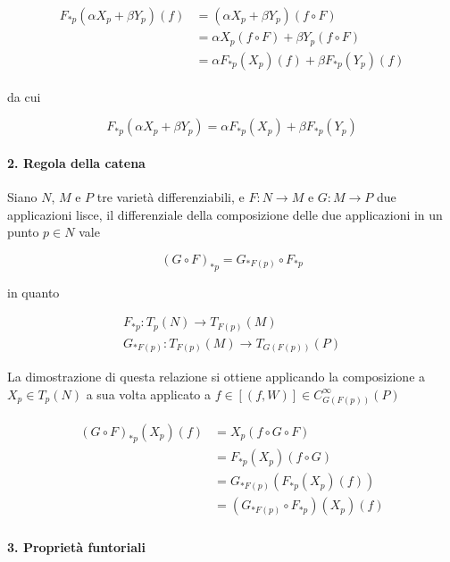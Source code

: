 \begin{align}
	\begin{split}
		F_{*p}(\alpha X_{p} + \beta Y_{p})(f) &= (\alpha X_{p} + \beta Y_{p})(f \circ F)\\
		&= \alpha X_{p}(f \circ F) + \beta Y_{p}(f \circ F)\\
		&= \alpha F_{*p}(X_{p})(f) + \beta F_{*p}(Y_{p})(f)
	\end{split}
\end{align}

da cui

\begin{equation}
	F_{*p}(\alpha X_{p} + \beta Y_{p}) = \alpha F_{*p}(X_{p}) + \beta F_{*p}(Y_{p})
\end{equation}

\paragraph{2. Regola della catena}

Siano $ N $, $ M $ e $ P $ tre varietà differenziabili, e $ F : N \to M $ e $ G : M \to P $ due applicazioni lisce, il differenziale della composizione delle due applicazioni in un punto $ p \in N $ vale

\begin{equation}
	(G \circ F)_{*p} = G_{*F(p)} \circ F_{*p}
\end{equation}

in quanto

\begin{gather}
	F_{*p} : T_{p}(N) \to T_{F(p)}(M)\\
	G_{*F(p)} : T_{F(p)}(M) \to T_{G(F(p))}(P)
\end{gather}

La dimostrazione di questa relazione si ottiene applicando la composizione a $ X_{p} \in T_{p}(N) $ a sua volta applicato a $ f \in [(f,W)] \in C_{G(F(p))}^{\infty}(P) $

\begin{align}
	\begin{split}
		(G \circ F)_{*p} (X_{p})(f) &= X_{p} (f \circ G \circ F)\\
		&= F_{*p} (X_{p}) (f \circ G)\\
		&= G_{*F(p)} (F_{*p} (X_{p})(f))\\
		&= (G_{*F(p)} \circ F_{*p})(X_{p})(f)
	\end{split}
\end{align}

\paragraph{3. Proprietà funtoriali}

